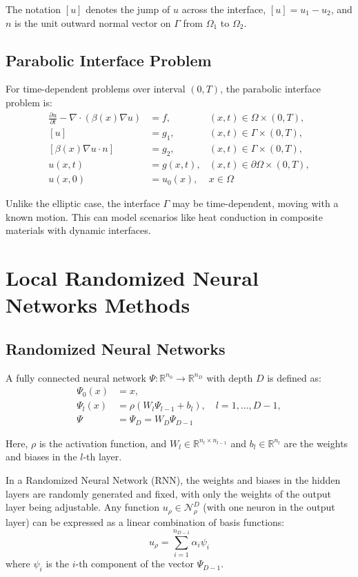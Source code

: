 \documentclass[11pt]{article}
\begin{document}
The notation $[u]$ denotes the jump of $u$ across the interface, $[u] = u_1 - u_2$, and $n$ is the unit outward normal vector on $\Gamma$ from $\Omega_1$ to $\Omega_2$.

\subsection{Parabolic Interface Problem}
For time-dependent problems over interval $(0,T)$, the parabolic interface problem is:
\begin{align}
\frac{\partial u}{\partial t} - \nabla \cdot (\beta(x)\nabla u) &= f, &(x,t) \in \Omega \times (0,T), \\
[u] &= g_1, &(x,t) \in \Gamma \times (0,T), \\
[\beta(x)\nabla u \cdot n] &= g_2, &(x,t) \in \Gamma \times (0,T), \\
u(x,t) &= g(x,t), &(x,t) \in \partial\Omega \times (0,T), \\
u(x,0) &= u_0(x), &x \in \Omega
\end{align}

Unlike the elliptic case, the interface $\Gamma$ may be time-dependent, moving with a known motion. This can model scenarios like heat conduction in composite materials with dynamic interfaces.

\section{Local Randomized Neural Networks Methods}

\subsection{Randomized Neural Networks}
A fully connected neural network $\Psi: \mathbb{R}^{n_0} \rightarrow \mathbb{R}^{n_D}$ with depth $D$ is defined as:
\begin{align}
\Psi_0(x) &= x, \\
\Psi_l(x) &= \rho(W_l\Psi_{l-1} + b_l), \quad l = 1,\ldots,D-1, \\
\Psi &= \Psi_D = W_D\Psi_{D-1}
\end{align}

Here, $\rho$ is the activation function, and $W_l \in \mathbb{R}^{n_l \times n_{l-1}}$ and $b_l \in \mathbb{R}^{n_l}$ are the weights and biases in the $l$-th layer.

In a Randomized Neural Network (RNN), the weights and biases in the hidden layers are randomly generated and fixed, with only the weights of the output layer being adjustable. Any function $u_\rho \in \mathcal{N}_\rho^D$ (with one neuron in the output layer) can be expressed as a linear combination of basis functions:
\begin{equation}
u_\rho = \sum_{i=1}^{n_{D-1}} \alpha_i \psi_i
\end{equation}
where $\psi_i$ is the $i$-th component of the vector $\Psi_{D-1}$.
\end{document}
